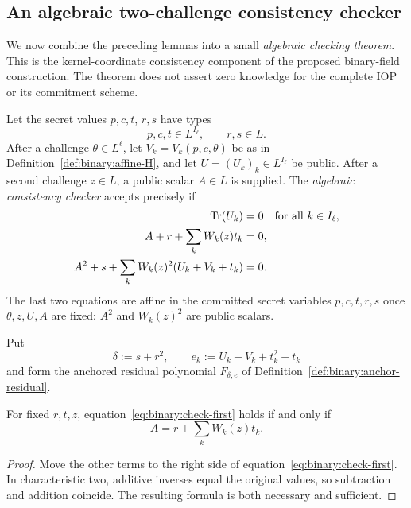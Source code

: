 \subsection{An algebraic two-challenge consistency checker}\label{sec:binary:checker}
We now combine the preceding lemmas into a small
\emph{algebraic checking theorem}. This is the
kernel-coordinate consistency component of the
proposed binary-field construction. The theorem
does not assert zero knowledge for the complete IOP
or its commitment scheme.

\begin{definition}\label{def:binary:checks}
Let the secret values $p,c,t$, $r,s$ have types
\[
 p,c,t\in L^{I_\ell},\qquad r,s\in L.
\]
After a challenge $\theta\in L^\ell$,
let $V_k=V_k(p,c,\theta)$ be as in
Definition~\ref{def:binary:affine-H}, and let
$U=(U_k)_k\in L^{I_\ell}$ be public.
After a second challenge $z\in L$, a public scalar
$A\in L$ is supplied. The \emph{algebraic
consistency checker} accepts precisely if
\begin{align}
 \operatorname{Tr}(U_k)&=0\quad\text{for all }k\in I_\ell,
 \label{eq:binary:check-traces}\\
 A+r+\sum_kW_k(z)t_k&=0,
 \label{eq:binary:check-first}\\
 A^2+s+\sum_kW_k(z)^2(U_k+V_k+t_k)&=0.
 \label{eq:binary:check-second}
\end{align}
The last two equations are affine in the
committed secret variables $p,c,t,r,s$ once
$\theta,z,U,A$ are fixed: $A^2$ and $W_k(z)^2$
are public scalars.
\end{definition}

\begin{definition}\label{def:binary:check-residuals}
Put
\[
 \delta:=s+r^2,\qquad
 e_k:=U_k+V_k+t_k^2+t_k
\]
and form the anchored residual polynomial
$F_{\delta,e}$ of Definition~\ref{def:binary:anchor-residual}.
\end{definition}

\begin{lemma}\label{lem:binary:first-determines}
For fixed $r,t,z$, equation~\eqref{eq:binary:check-first}
holds if and only if
\[
 A=r+\sum_kW_k(z)t_k.
\]
\end{lemma}
\begin{proof}
Move the other terms to the right side of
equation~\eqref{eq:binary:check-first}.
In characteristic two, additive inverses
equal the original values, so subtraction and
addition coincide. The resulting formula is
both necessary and sufficient.
\end{proof}

